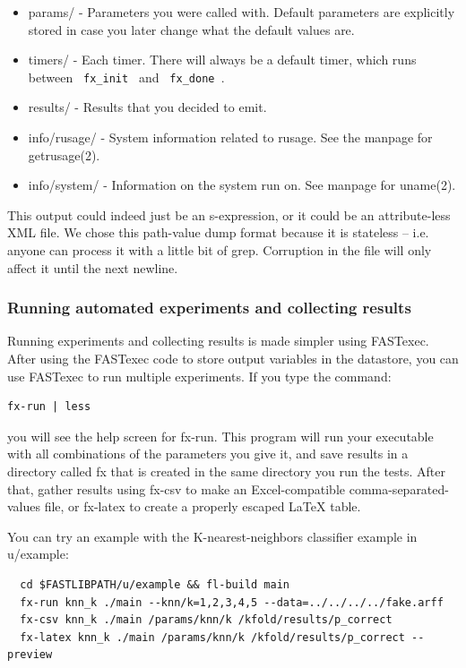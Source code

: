 \documentclass[letter]{report}
\begin{document}
\begin{itemize}
\item params/ - Parameters you were called with. Default parameters are explicitly stored in case you later change what the default values are.
\item timers/ - Each timer. There will always be a default timer, which runs between \verb= fx_init = and \verb= fx_done =.
\item results/ - Results that you decided to emit.
\item info/rusage/ - System information related to rusage. See the manpage for getrusage(2).
\item info/system/ - Information on the system run on. See manpage for uname(2). 
\end{itemize}
This output could indeed just be an s-expression, or it could be an attribute-less XML file. We chose this path-value dump format because it is stateless -- i.e. anyone can process it with a little bit of grep. Corruption in the file will only affect it until the next newline.

\subsubsection{Running automated experiments and collecting results}

Running experiments and collecting results is made simpler using FASTexec. After using the FASTexec code to store output variables in the datastore, you can use FASTexec to run multiple experiments. If you type the command:
\begin{verbatim}
fx-run | less
\end{verbatim}
you will see the help screen for fx-run. This program will run your executable with all combinations of the parameters you give it, and save results in a directory called fx that is created in the same directory you run the tests. After that, gather results using fx-csv to make an Excel-compatible comma-separated-values file, or fx-latex to create a properly escaped LaTeX table.

You can try an example with the K-nearest-neighbors classifier example in u/example:
\begin{verbatim}
  cd $FASTLIBPATH/u/example && fl-build main
  fx-run knn_k ./main --knn/k=1,2,3,4,5 --data=../../../../fake.arff
  fx-csv knn_k ./main /params/knn/k /kfold/results/p_correct
  fx-latex knn_k ./main /params/knn/k /kfold/results/p_correct --preview
\end{verbatim}
\end{document}
